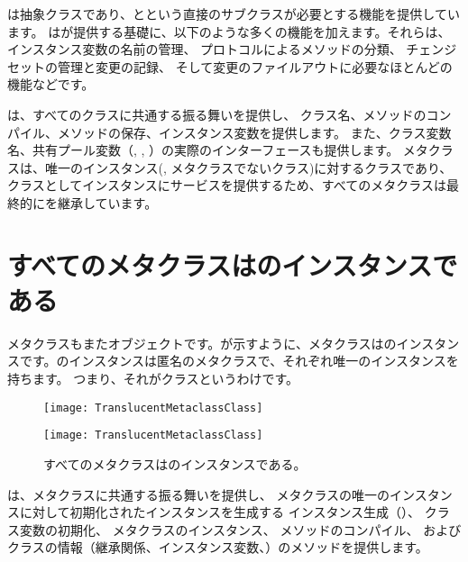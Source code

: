 \documentclass[a4paper,10pt,twoside]{book}
\begin{document}
は抽象クラスであり、とという直接のサブクラスが必要とする機能を提供しています。
はが提供する基礎に、以下のような多くの機能を加えます。それらは、
インスタンス変数の名前の管理、
プロトコルによるメソッドの分類、
チェンジセットの管理と変更の記録、
そして変更のファイルアウトに必要なほとんどの機能などです。

は、すべてのクラスに共通する振る舞いを提供し、
クラス名、メソッドのコンパイル、メソッドの保存、インスタンス変数を提供します。
また、クラス変数名、共有プール変数（, , ）の実際のインターフェースも提供します。
メタクラスは、唯一のインスタンス(\ie, メタクラスでないクラス)に対するクラスであり、クラスとしてインスタンスにサービスを提供するため、すべてのメタクラスは最終的にを継承しています。

\section{すべてのメタクラスはのインスタンスである}

メタクラスもまたオブジェクトです。が示すように、メタクラスはのインスタンスです。のインスタンスは匿名のメタクラスで、それぞれ唯一のインスタンスを持ちます。
つまり、それがクラスというわけです。

\begin{center}
\begin{figure}
\ifluluelse
	{\centerline{\texttt{[image: TranslucentMetaclassClass]}}}
	{\centerline{\texttt{[image: TranslucentMetaclassClass]}}}
\caption{すべてのメタクラスはのインスタンスである。}
\end{figure}
\end{center}

は、メタクラスに共通する振る舞いを提供し、
メタクラスの唯一のインスタンスに対して初期化されたインスタンスを生成する
インスタンス生成（）、
クラス変数の初期化、
メタクラスのインスタンス、
メソッドのコンパイル、%
およびクラスの情報（継承関係、インスタンス変数、\etc）のメソッドを提供します。
\end{document}
